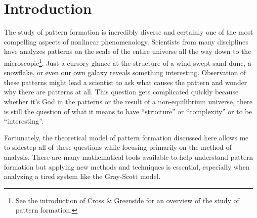 		
\chapter*{Introduction}

	The study of pattern formation is incredibly diverse and certainly one of the most compelling aspects of nonlinear phenomenology. Scientists from many disciplines have analyzes patterns on the scale of the entire universe all the way down to the microscopic\footnote{See the introduction of Cross \& Greenside for an overview of the study of pattern formation.}. Just a cursory glance at the structure of a wind-swept sand dune, a snowflake, or even our own galaxy reveals something interesting. Observation of these patterns might lead a scientist to ask what causes the pattern and wonder why there are patterns at all. This question gets complicated quickly because whether it's God in the patterns or the result of a non-equilibrium universe, there is still the question of what it means to have ``structure'' or ``complexity'' or to be ``interesting''.
	
	Fortunately, the theoretical model of pattern formation discussed here allows me to sidestep all of these questions while focusing primarily on the method of analysis. There are many mathematical tools available to help understand pattern formation but applying new methods and techniques is essential, especially when analyzing a tired system like the Gray-Scott model.